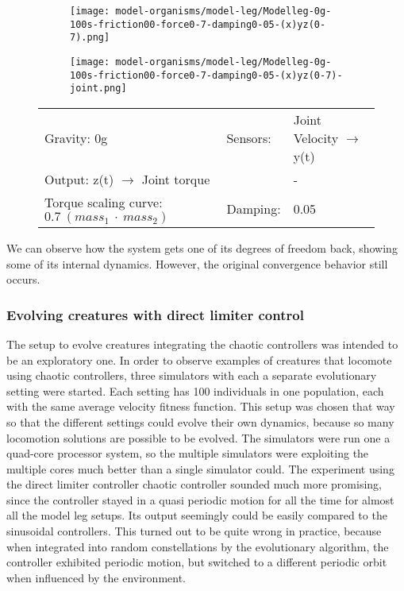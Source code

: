 \documentclass[main]{subfiles}
\begin{document}
\begin{figure}[H]
	\centering
		\begin{subfigure}[c]{0.45\textwidth}
	\texttt{[image: model-organisms/model-leg/Modelleg-0g-100s-friction00-force0-7-damping0-05-(x)yz(0-7).png]}
		\end{subfigure}
	\begin{subfigure}[c]{0.45\textwidth}
	\texttt{[image: model-organisms/model-leg/Modelleg-0g-100s-friction00-force0-7-damping0-05-(x)yz(0-7)-joint.png]}
		\end{subfigure}
	\caption[Limited chaotic controller controlling model leg]{}
	\begin{tabular}{l|ll}
	\hline 
	Gravity: 0g  & Sensors: & Joint Velocity \(\rightarrow\) y(t)\\
	 Output: z(t) \(\rightarrow\) Joint torque & & - \\
	  Torque scaling curve: \(0.7~(mass_1~\cdot~mass_2)\) & Damping: & 0.05 \\
	  \hline
	\end{tabular}

	\label{figure:limited-damped-model-leg8}
\end{figure}

We can observe how the system gets one of its degrees of freedom back, showing some of its internal dynamics. However, the original convergence behavior still occurs.


\subsubsection{Evolving creatures with direct limiter control}


The setup to evolve creatures integrating the chaotic controllers was intended to be an exploratory one. %
%
In order to observe examples of creatures that locomote using chaotic controllers, three simulators with each a separate evolutionary setting were started. %
%
Each setting has 100 individuals in one population, each with the same average velocity fitness function. %
%
This setup was chosen that way so that the different settings could evolve their own dynamics, because so many locomotion solutions are possible to be evolved. %
%
The simulators were run one a quad-core processor system, so the multiple simulators were exploiting the multiple cores much better than a single simulator could. %
%
The experiment using the direct limiter controller chaotic controller sounded much more promising, since the controller stayed in a quasi periodic motion for all the time for almost all the model leg setups. %
%
Its output seemingly could be easily compared to the sinusoidal controllers. %
%
This turned out to be quite wrong in practice, because when integrated into random constellations by the evolutionary algorithm, the controller exhibited periodic motion, but switched to a different periodic orbit when influenced by the environment. 
\end{document}
